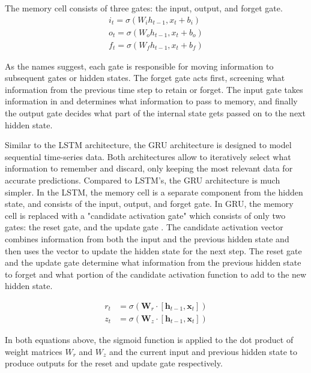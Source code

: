 \documentclass[conference]{IEEEtran}
\begin{document}
The memory cell consists of three gates: the input, output, and forget gate.
\begin{equation}
	\begin{aligned}
		i_t = \sigma(W_i h_{t-1},x_t+b_i) \\
		o_t = \sigma(W_o h_{t-1},x_t+b_o) \\
		f_t = \sigma(W_f h_{t-1},x_t+b_f)
	\end{aligned}
\end{equation}

As the names suggest, each gate is responsible for moving information to subsequent gates or hidden states. The forget gate acts first, screening what information from the previous time step to retain or forget. The input gate takes information in and determines what information to pass to memory, and finally the output gate decides what part of the internal state gets passed on to the next hidden state.

Similar to the LSTM architecture, the GRU architecture is designed to model sequential time-series data. Both architectures allow to iteratively select what information to remember and discard, only keeping the most relevant data for accurate predictions. Compared to LSTM's, the GRU architecture is much simpler. In the LSTM, the memory cell is a separate component from the hidden state, and consists of the input, output, and forget gate. In GRU, the memory cell is replaced with a "candidate activation gate" which consists of only two gates: the reset gate, and the update gate \cite{Nama2023}. The candidate activation vector combines information from both the input and the previous hidden state and then uses the vector to update the hidden state for the next step. The reset gate and the update gate determine what information from the previous hidden state to forget and what portion of the candidate activation function to add to the new hidden state.

\begin{equation}
	\begin{aligned}r_t &= \sigma\left(\mathbf{W}_r \cdot [\mathbf{h}_{t-1}, \mathbf{x}_t]\right)\\z_t &= \sigma\left(\mathbf{W}_z \cdot [\mathbf{h}_{t-1}, \mathbf{x}_t]\right)\end{aligned}
\end{equation}

In both equations above, the sigmoid function is applied to the dot product of weight matrices $W_r$ and $W_z$ and the current input and previous hidden state to produce outputs for the reset and update gate respectively.
\end{document}

